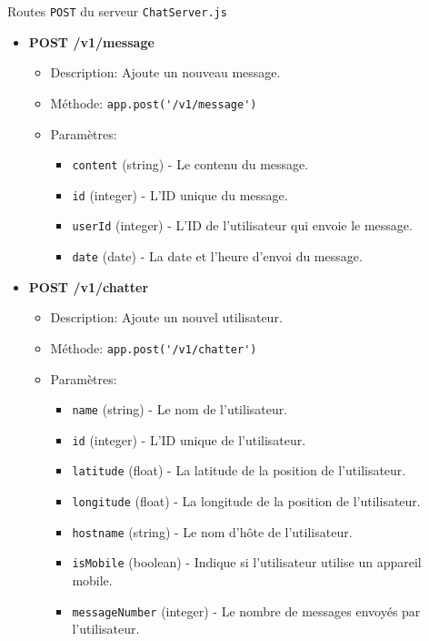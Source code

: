 \documentclass{beamer}
\begin{document}
    \begin{frame}{Routes \lstinline{POST} du serveur \lstinline{ChatServer.js}}
        \begin{itemize}
            \item \textbf{POST /v1/message}
            \begin{itemize}
                \item Description: Ajoute un nouveau message.
                \item Méthode: \lstinline{app.post('/v1/message')}
                \item Paramètres:
                \begin{itemize}
                    \item \lstinline{content} (string) - Le contenu du message.
                    \item \lstinline{id} (integer) - L'ID unique du message.
                    \item \lstinline{userId} (integer) - L'ID de l'utilisateur qui envoie le message.
                    \item \lstinline{date} (date) - La date et l'heure d'envoi du message.
                \end{itemize}
            \end{itemize}
            \item \textbf{POST /v1/chatter}
            \begin{itemize}
                \item Description: Ajoute un nouvel utilisateur.
                \item Méthode: \lstinline{app.post('/v1/chatter')}
                \item Paramètres:
                \begin{itemize}
                    \item \lstinline{name} (string) - Le nom de l'utilisateur.
                    \item \lstinline{id} (integer) - L'ID unique de l'utilisateur.
                    \item \lstinline{latitude} (float) - La latitude de la position de l'utilisateur.
                    \item \lstinline{longitude} (float) - La longitude de la position de l'utilisateur.
                    \item \lstinline{hostname} (string) - Le nom d'hôte de l'utilisateur.
                    \item \lstinline{isMobile} (boolean) - Indique si l'utilisateur utilise un appareil mobile.
                    \item \lstinline{messageNumber} (integer) - Le nombre de messages envoyés par l'utilisateur.
                \end{itemize}
            \end{itemize}
        \end{itemize}
    \end{frame}
\end{document}
